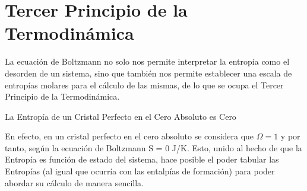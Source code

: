 \section{Tercer Principio de la Termodinámica}

La ecuación de Boltzmann no solo nos permite interpretar la entropía como el desorden de un sistema, sino que también nos permite establecer una escala de entropías molares para el cálculo de las mismas, de lo que se ocupa el Tercer Principio de la Termodinámica.\\

\begin{definition}
	La Entropía de un Cristal Perfecto en el Cero Absoluto es Cero
\end{definition}

En efecto, en un cristal perfecto en el cero absoluto se considera que $\Omega = 1$ y por tanto, según la ecuación de Boltzmann S = 0 J/K. Esto, unido al hecho de que la Entropía es función de estado del sistema, hace posible el poder tabular las Entropías (al igual que ocurría con las entalpías de formación) para poder abordar su cálculo de manera sencilla.
